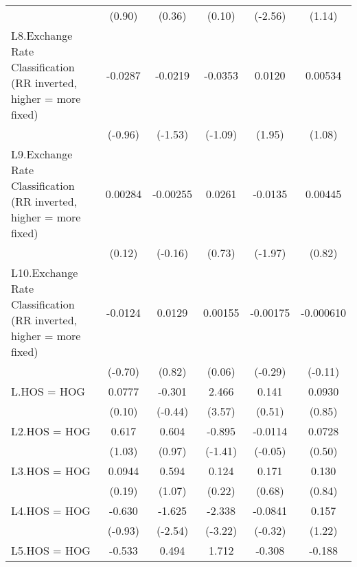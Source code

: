{\begin{longtable}{l*{5}{c}}
                &   (0.90)         &   (0.36)         &   (0.10)         &  (-2.56)         &   (1.14)         \\
\addlinespace
L8.Exchange Rate Classification (RR inverted, higher = more fixed)&  -0.0287         &  -0.0219         &  -0.0353         &   0.0120         &  0.00534         \\
                &  (-0.96)         &  (-1.53)         &  (-1.09)         &   (1.95)         &   (1.08)         \\
\addlinespace
L9.Exchange Rate Classification (RR inverted, higher = more fixed)&  0.00284         & -0.00255         &   0.0261         &  -0.0135         &  0.00445         \\
                &   (0.12)         &  (-0.16)         &   (0.73)         &  (-1.97)         &   (0.82)         \\
\addlinespace
L10.Exchange Rate Classification (RR inverted, higher = more fixed)&  -0.0124         &   0.0129         &  0.00155         & -0.00175         &-0.000610         \\
                &  (-0.70)         &   (0.82)         &   (0.06)         &  (-0.29)         &  (-0.11)         \\
\addlinespace
L.HOS = HOG     &   0.0777         &   -0.301         &    2.466\sym{***}&    0.141         &   0.0930         \\
                &   (0.10)         &  (-0.44)         &   (3.57)         &   (0.51)         &   (0.85)         \\
\addlinespace
L2.HOS = HOG    &    0.617         &    0.604         &   -0.895         &  -0.0114         &   0.0728         \\
                &   (1.03)         &   (0.97)         &  (-1.41)         &  (-0.05)         &   (0.50)         \\
\addlinespace
L3.HOS = HOG    &   0.0944         &    0.594         &    0.124         &    0.171         &    0.130         \\
                &   (0.19)         &   (1.07)         &   (0.22)         &   (0.68)         &   (0.84)         \\
\addlinespace
L4.HOS = HOG    &   -0.630         &   -1.625\sym{*}  &   -2.338\sym{**} &  -0.0841         &    0.157         \\
                &  (-0.93)         &  (-2.54)         &  (-3.22)         &  (-0.32)         &   (1.22)         \\
\addlinespace
L5.HOS = HOG    &   -0.533         &    0.494         &    1.712\sym{*}  &   -0.308         &   -0.188\sym{*}  \\

\end{longtable}}
